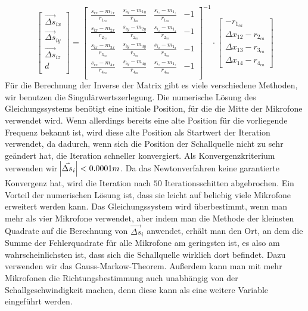 $$
\begin{bmatrix}
\vec{\Delta{s}}_{ix} \\
\vec{\Delta{s}}_{iy} \\
\vec{\Delta{s}}_{iz} \\
                d \\
\end{bmatrix}
=
{\begin{bmatrix}
\frac{s_{ix} - m_{1x}}{r_{1_{ca}}} & \frac{s_{iy} - m_{1y}}{r_{1_{ca}}} & \frac{s_{i_z} - m_{1_z}}{r_{1_{ca}}} & -1 \\
\frac{s_{ix} - m_{2x}}{r_{2_{ca}}} & \frac{s_{iy} - m_{2y}}{r_{2_{ca}}} & \frac{s_{i_z} - m_{1_z}}{r_{2_{ca}}} & -1 \\
\frac{s_{ix} - m_{3x}}{r_{3_{ca}}} & \frac{s_{iy} - m_{3y}}{r_{3_{ca}}} & \frac{s_{i_z} - m_{1_z}}{r_{3_{ca}}} & -1 \\
\frac{s_{ix} - m_{4x}}{r_{4_{ca}}} & \frac{s_{iy} - m_{4y}}{r_{4_{ca}}} & \frac{s_{i_z} - m_{1_z}}{r_{4_{ca}}} & -1 \\
\end{bmatrix}}^{-1}
\cdot
\begin{bmatrix}
-r_{1_{ca}}\\
\Delta{x_{12}} - r_{2_{ca}}\\
\Delta{x_{13}} - r_{3_{ca}}\\
\Delta{x_{14}} - r_{4_{ca}}
\end{bmatrix}
$$
Für die Berechnung der Inverse der Matrix gibt es viele verschiedene Methoden, wir benutzen die Singulärwertszerlegung. Die numerische Lösung des Gleichungssystems benötigt eine initiale Position, für die die Mitte der Mikrofone verwendet wird. Wenn allerdings bereits eine alte Position für die vorliegende Frequenz bekannt ist, wird diese alte Position als Startwert der Iteration verwendet, da dadurch, wenn sich die Position der Schallquelle nicht zu sehr geändert hat, die Iteration schneller konvergiert. Als Konvergenzkriterium verwenden wir $\abs{\vec{\Delta{s}}_i} < 0.0001m$. Da das Newtonverfahren keine garantierte Konvergenz hat, wird die Iteration nach $50$ Iterationsschitten abgebrochen.
Ein Vorteil der numerischen Lösung ist, dass sie leicht auf beliebig viele Mikrofone erweitert werden kann. Das Gleichungssystem wird überbestimmt, wenn man mehr als vier Mikrofone verwendet, aber indem man die Methode der kleinsten Quadrate auf die Berechnung von $\vec{\Delta{s}}_i$ anwendet, erhält man den Ort, an dem die Summe der Fehlerquadrate für alle Mikrofone am geringsten ist, es also am wahrscheinlichsten ist, dass sich die Schallquelle wirklich dort befindet. Dazu verwenden wir das Gauss-Markow-Theorem. Außerdem kann man mit mehr Mikrofonen die Richtungsbestimmung auch unabhängig von der Schallgeschwindigkeit machen, denn diese kann als eine weitere Variable eingeführt werden.
